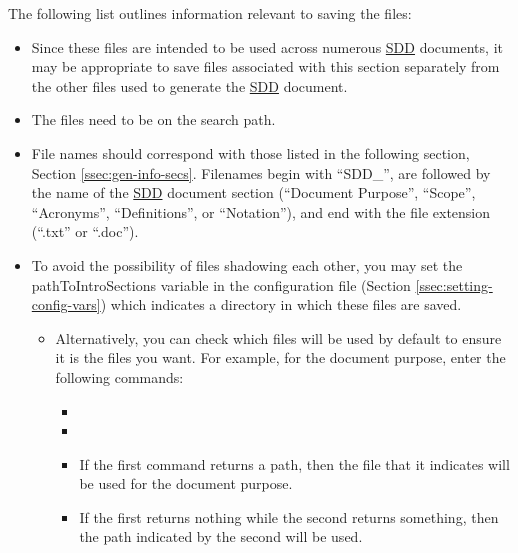 \documentclass{mcscert}
\begin{document}
	The following list outlines information relevant to saving the files:
  \begin{itemize}
    \item Since these files are intended to be used across numerous \hyperref[acr:sdd]{SDD} documents, it may be appropriate to save files associated with this section separately from the other files used to generate the \hyperref[acr:sdd]{SDD} document.
    \item The files need to be on the \matlab{} search path.
    \item File names should correspond with those listed in the following section, Section \hyperref[ssec:gen-info-secs]{\ref*{ssec:gen-info-secs}}. 
    Filenames begin with ``SDD\_'', are followed by the name of the \hyperref[acr:sdd]{SDD} document section (``Document Purpose'', ``Scope'', ``Acronyms'', ``Definitions'', or ``Notation''), and end with the file extension (``.txt'' or ``.doc'').
    \item To avoid the possibility of files shadowing each other, you may set the pathToIntroSections variable in the configuration file (Section \hyperref[ssec:setting-config-vars]{\ref*{ssec:setting-config-vars}}) which indicates a directory in which these files are saved.
    \begin{itemize}
      \item Alternatively, you can check which files will be used by default to ensure it is the files you want. 
      For example, for the document purpose, enter the following commands:
      \begin{itemize}
        \item {}
        \item {}
      \end{itemize}
      \begin{itemize}
        \item If the first command returns a path, then the file that it indicates will be used for the document purpose.
        \item If the first returns nothing while the second returns something, then the path indicated by the second will be used.
      \end{itemize}
    \end{itemize}
  \end{itemize}
\end{document}

